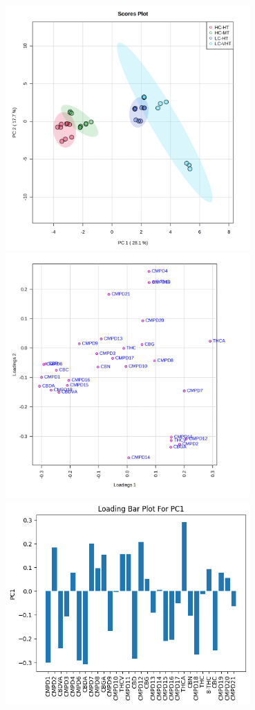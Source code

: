 \documentclass{article}
\begin{document}
\includegraphics[width=0.7\textwidth]{pca_score2d_1_dpi300.png}
\includegraphics[width=0.7\textwidth]{pca_loading_0_dpi300.png}
\includegraphics[width=0.7\textwidth]{PC1.png}
\end{document}
